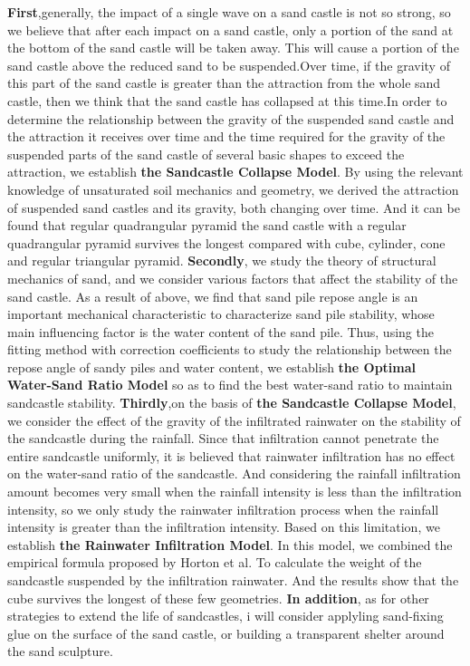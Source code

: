 \documentclass[12pt]{article}
\begin{document}
\textbf{First},generally, the impact of a single wave on a sand castle is not so strong, so we believe that after each impact on a sand castle, only a portion of the sand at the bottom of the sand castle will be taken away. This will cause a portion of the sand castle above the reduced sand to be suspended.Over time, if the gravity of this part of the sand castle is greater than the attraction from the whole sand castle, then we think that the sand castle has collapsed at this time.In order to determine the relationship between the gravity of the suspended sand castle and the attraction it receives over time and the time required for the gravity of the suspended parts of the sand castle of several basic shapes to exceed the attraction, we establish \textbf{the Sandcastle Collapse Model}. By using the relevant knowledge of unsaturated soil mechanics and geometry, we derived the attraction of suspended sand castles and its gravity, both changing over time. And it can be found that regular quadrangular pyramid the sand castle with a regular quadrangular pyramid survives the longest compared with cube, cylinder, cone and regular triangular pyramid. \textbf{Secondly}, we study the theory of structural mechanics of sand, and we consider various factors that affect the stability of the sand castle. As a result of above, we find that sand pile repose angle is an important mechanical characteristic to characterize sand pile stability, whose main influencing factor is the water content of the sand pile. Thus, using the fitting method with correction coefficients to study the relationship between the repose angle of sandy piles and water content,  we establish \textbf{the Optimal Water-Sand Ratio Model} so as to find the best water-sand ratio to maintain sandcastle stability. \textbf{Thirdly},on the basis of \textbf{the Sandcastle Collapse Model}, we consider the effect of the gravity of the infiltrated rainwater on the stability of the sandcastle during the rainfall. Since that infiltration cannot penetrate the entire sandcastle uniformly, it is believed that rainwater infiltration has no effect on the water-sand ratio of the sandcastle. And considering the rainfall infiltration amount becomes very small when the rainfall intensity is less than the infiltration intensity, so we only study the rainwater infiltration process when the rainfall intensity is greater than the infiltration intensity. Based on this limitation, we establish \textbf{the Rainwater Infiltration Model}. In this model, we combined the empirical formula proposed by Horton et al. \cite{1} To calculate the weight of the sandcastle suspended by the infiltration rainwater.
And the results show that the cube survives the longest of these few geometries. \textbf{In addition}, as for other strategies to extend the life of sandcastles, i will consider applyling sand-fixing glue on the surface of the sand castle, or building a transparent shelter around the sand sculpture.
\end{document}
